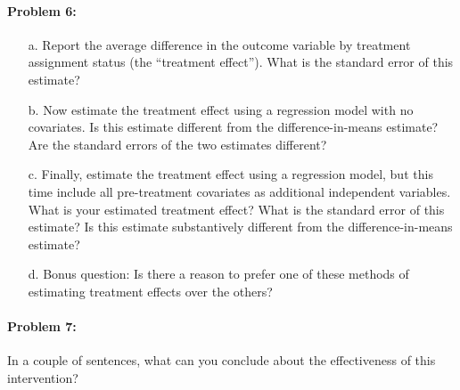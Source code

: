 \documentclass{article}
\begin{document}
\paragraph{Problem 6:}
\begin{itemize}
\item[a.] Report the average difference in the outcome variable by treatment
assignment status (the ``treatment effect''). What is the standard error of this estimate? 

\item[b.] Now estimate the treatment effect using a regression model with no
covariates. Is this estimate different from the
difference-in-means estimate? Are the standard errors of the two estimates different?

\item[c.] Finally, estimate the treatment effect using a regression model, but
this time include all pre-treatment covariates as additional independent
variables.  What is your estimated treatment effect? What is the
standard error of this estimate? Is this estimate substantively
different from the difference-in-means estimate?

\item[d.] Bonus question: Is there a reason to prefer one of these methods of estimating treatment effects over the others?
\end{itemize}

\paragraph{Problem 7:}
In a couple of sentences, what can you conclude about the
effectiveness of this intervention? 
\end{document}
